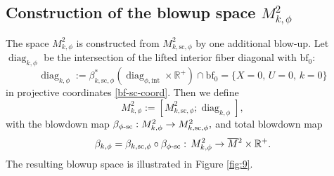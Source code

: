 \documentclass[JEP,XML,SOM,Unicode,NoFloatCountersInSection,published]{cedram}
\newcommand{\intt}{\mathrm{int}}
\newcommand{\phisc}{{\phi\textup{-}\ssc}}
\theoremstyle{plain}
\theoremstyle{definition}
\newcommand{\R}{{\mathbb{R}}}
\newcommand{\bbf}{{\mathrm{bf}}}
\newcommand{\bfz}{{\bbf_0}}
\newcommand{\ssc}{{\mathrm{sc}}}
\DeclareMathOperator\diag{diag}
\newcommand{\Mbar}{{\overline{M}}}\let\M\Mbar
\begin{document}
\subsection{Construction of the blowup space $M^{2}_{k,\phi}$}
The space $M^{2}_{k,\phi}$ is constructed from $M^{2}_{k, \ssc,\phi}$
by one additional blow-up. Let $\diag_{k,\phi}$ be the intersection of the lifted interior fiber diagonal with $\bfz$:
\begin{equation}
\label{eqn:def diag k phi}
\diag_{k,\phi} := \beta_{k,\ssc,\phi}^*(\diag_{\phi,\intt}\times\R^+) \cap \bbf_0 = \{ X=0,\, U=0,\, k=0\}
\end{equation}
in projective coordinates
\eqref{bf-sc-coord}.
Then we define
\begin{equation}
M^{2}_{k,\phi} := [ M^{2}_{k, \ssc,\phi} ; \diag_{k,\phi}],
\end{equation}
with the blowdown map $\beta_{ \phisc} : M^{2}_{k, \phi} \to M^{2}_{k, \ssc,\phi},$ and total blowdown map
\begin{equation*}
\beta_{k, \phi} = \beta_{k, \ssc,\phi} \circ \beta_{\phisc} :\,
M^{2}_{k,\phi} \to \Mbar{}^{2} \times \R^+.
\end{equation*}
The resulting blowup space is illustrated in Figure \ref{fig:9}.
\end{document}
